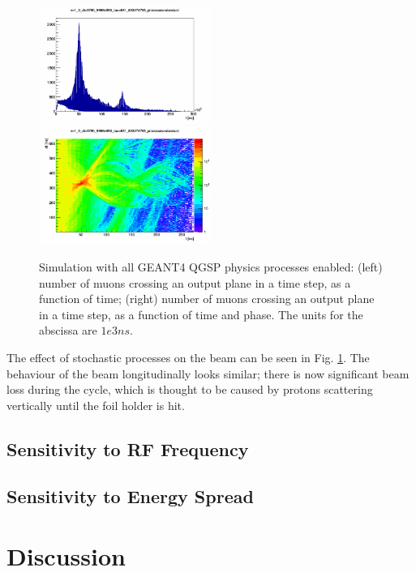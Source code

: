 \documentclass{paper}
\begin{document}
\begin{figure}
		\includegraphics[width=0.5\textwidth]{images/beam_monitor_v=1_0_dt=3790_99964859_tau=631_833274765_processes=standard}
		\includegraphics[width=0.5\textwidth]{images/time_vs_dt_v=1_0_dt=3790_99964859_tau=631_833274765_processes=standard}
	\caption{Simulation with all GEANT4 QGSP physics processes enabled: (left)
           number of muons crossing an output plane in a time step, as a 
           function of time; (right) number of muons crossing an output plane in
           a time step, as a function of time and phase. The 
           units for the abscissa are $1e3 ns$.}
	\label{fig:mc_stochastic processes}
\end{figure}

The effect of stochastic processes on the beam can be seen in Fig. 
\ref{fig:mc_stochastic processes}. The behaviour of the beam longitudinally
looks similar; there is now significant beam loss during the cycle,
which is thought to be caused by protons scattering vertically until the foil 
holder is hit.

\subsection{Sensitivity to RF Frequency}


\subsection{Sensitivity to Energy Spread}


\section{Discussion}
\end{document}
